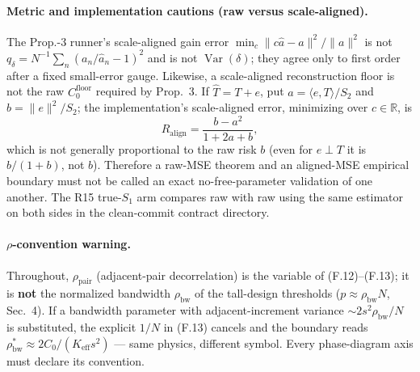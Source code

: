 \paragraph{Metric and implementation cautions (raw versus scale-aligned).} The Prop.-3 runner's scale-aligned gain error $\min_c\|c\hat a-a\|^2/\|a\|^2$ is not $q_\delta=N^{-1}\sum_n(a_n/\hat a_n-1)^2$ and is not $\operatorname{Var}(\delta)$; they agree only to first order after a fixed small-error gauge. Likewise, a scale-aligned reconstruction floor is not the raw $C_0^{\mathrm{floor}}$ required by Prop.~3. If $\hat T=T+e$, put $a=\langle e,T\rangle/S_2$ and $b=\|e\|^2/S_2$; the implementation's scale-aligned error, minimizing over $c\in\mathbb R$, is
\begin{equation}
R_{\mathrm{align}}=\frac{b-a^2}{1+2a+b}, \tag{F.17}
\end{equation}
which is not generally proportional to the raw risk $b$ (even for $e\perp T$ it is $b/(1+b)$, not $b$). Therefore a raw-MSE theorem and an aligned-MSE empirical boundary must not be called an exact no-free-parameter validation of one another. The R15 true-$S_1$ arm compares raw with raw using the same estimator on both sides in the clean-commit contract directory.

\paragraph{$\rho$-convention warning.} Throughout, $\rho_{\mathrm{pair}}$ (adjacent-pair decorrelation) is the variable of (F.12)--(F.13); it is \textbf{not} the normalized bandwidth $\rho_{\mathrm{bw}}$ of the tall-design thresholds ($p\approx\rho_{\mathrm{bw}}N$, Sec.~4). If a bandwidth parameter with adjacent-increment variance $\sim2s^2\rho_{\mathrm{bw}}/N$ is substituted, the explicit $1/N$ in (F.13) cancels and the boundary reads $\rho^*_{\mathrm{bw}}\approx2C_0/(K_{\mathrm{eff}}s^2)$ --- same physics, different symbol. Every phase-diagram axis must declare its convention.

